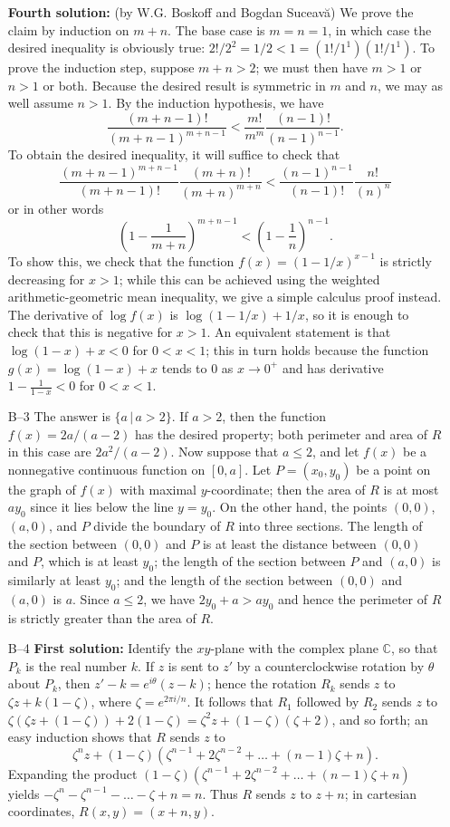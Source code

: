\documentclass[amssymb,twocolumn,pra,10pt,aps]{revtex4-1}
\begin{document}
\begin{itemize}
\textbf{Fourth solution:} (by W.G. Boskoff and Bogdan Suceav\u{a})
We prove the claim by induction on $m+n$. The base case is $m=n=1$, in which case
the desired inequality is obviously true: $2!/2^2 = 1/2 < 1 = (1!/1^1)(1!/1^1)$.
To prove the induction step, suppose $m+n > 2$; we must then have $m>1$ or $n>1$ or both.
Because the desired result is symmetric in $m$ and $n$, we may as well assume $n > 1$.
By the induction hypothesis, we have
\[
\frac{(m+n-1)!}{(m+n-1)^{m+n-1}} < \frac{m!}{m^m} \frac{(n-1)!}{(n-1)^{n-1}}.
\]
To obtain the desired inequality, it will suffice to check that
\[
\frac{(m+n-1)^{m+n-1}}{(m+n-1)!} \frac{(m+n)!}{(m+n)^{m+n}}< \frac{(n-1)^{n-1}}{(n-1)!} \frac{n!}{(n)^{n}}
\]
or in other words
\[
\left( 1 - \frac{1}{m+n} \right)^{m+n-1} < \left(1 - \frac{1}{n} \right)^{n-1}.
\]
To show this, we check that the function $f(x) = (1 - 1/x)^{x-1}$
is strictly decreasing for $x>1$; while this can be achieved using the weighted arithmetic-geometric mean
inequality, we give a simple calculus proof instead. The derivative of $\log f(x)$ is
$\log (1-1/x) + 1/x$, so it is enough to check that this is negative for $x>1$.
An equivalent statement is that $\log (1-x) + x < 0$ for $0 < x < 1$;
this in turn holds because the function $g(x) = \log(1-x) + x$ tends to 0 as $x \to 0^+$
and has derivative $1 - \frac{1}{1-x} < 0$ for $0 < x < 1$.

\item[B--3]
The answer is $\{a\,|\,a>2\}$. If $a>2$, then the function $f(x) =
2a/(a-2)$ has the desired property; both perimeter and area of $R$
in this case are $2a^2/(a-2)$. Now suppose that $a\leq 2$, and let
$f(x)$ be a nonnegative continuous function on $[0,a]$. Let
$P=(x_0,y_0)$ be a point on the graph of $f(x)$ with maximal
$y$-coordinate; then the area of $R$ is at most $ay_0$ since it lies
below the line $y=y_0$. On the other hand, the points $(0,0)$,
$(a,0)$, and $P$ divide the boundary of $R$ into three sections. The
length of the section between $(0,0)$ and $P$ is at least the
distance between $(0,0)$ and $P$, which is at least $y_0$; the
length of the section between $P$ and $(a,0)$ is similarly at least
$y_0$; and the length of the section between $(0,0)$ and $(a,0)$ is
$a$. Since $a\leq 2$, we have $2y_0 + a > ay_0$ and hence the
perimeter of $R$ is strictly greater than the area of $R$.

\item[B--4]
\textbf{First solution:}
Identify the $xy$-plane with the complex plane $\mathbb{C}$, so that
$P_k$ is the real number $k$. If $z$ is sent to $z'$ by a
counterclockwise rotation by $\theta$ about $P_k$, then $z'-k =
e^{i\theta} (z-k)$; hence the rotation $R_k$ sends $z$ to $\zeta z +
k (1-\zeta)$, where $\zeta = e^{2\pi i/n}$. It follows that $R_1$
followed by $R_2$ sends $z$ to $\zeta(\zeta z +(1-\zeta)) + 2
(1-\zeta) = \zeta^2 z + (1-\zeta)(\zeta + 2)$, and so forth; an easy
induction shows that $R$ sends $z$ to
\[
\zeta^n z + (1-\zeta)(\zeta^{n-1} + 2 \zeta^{n-2} + \dots + (n-1)
\zeta + n).
\]
Expanding the product $(1-\zeta)(\zeta^{n-1} + 2 \zeta^{n-2} + \dots
+ (n-1) \zeta + n)$ yields $-\zeta^n - \zeta^{n-1} - \dots - \zeta +
n = n$. Thus $R$ sends $z$ to $z+n$; in cartesian coordinates,
$R(x,y) = (x+n,y)$.


\end{itemize}
\end{document}
